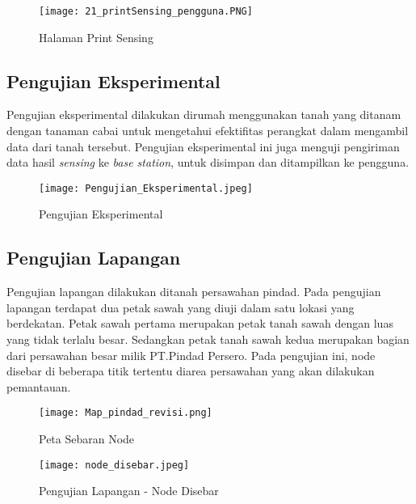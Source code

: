 \begin{itemize}
        \begin{figure}[H]
        	\centering  
        	\texttt{[image: 21\_printSensing\_pengguna.PNG]}  
        	\caption[Halaman Print Sensing]{Halaman Print Sensing} 
        	\label{fig:Halaman Print Sensing} 
        \end{figure}
        
    \end{itemize}
   
   \subsection{Pengujian Eksperimental}
   Pengujian eksperimental dilakukan dirumah menggunakan tanah yang ditanam dengan tanaman cabai untuk mengetahui efektifitas perangkat dalam mengambil data dari tanah tersebut. Pengujian eksperimental ini juga menguji pengiriman data hasil \textit{sensing} ke \textit{base station}, untuk disimpan dan ditampilkan ke pengguna. 
   
        \begin{figure}[H]
        	\centering  
        	\texttt{[image: Pengujian\_Eksperimental.jpeg]}  
        	\caption[Pengujian Eksperimental]{Pengujian Eksperimental} 
        	\label{fig:Pengujian Eksperimental} 
        \end{figure}
   
   \subsection{Pengujian Lapangan}
   Pengujian lapangan dilakukan ditanah persawahan pindad. Pada pengujian lapangan terdapat dua petak sawah yang diuji dalam satu lokasi yang berdekatan. Petak sawah pertama merupakan petak tanah sawah dengan luas yang tidak terlalu besar. Sedangkan petak tanah sawah kedua merupakan bagian dari persawahan besar milik PT.Pindad Persero. Pada pengujian ini, node disebar di beberapa titik tertentu diarea persawahan yang akan dilakukan pemantauan.
   
     \begin{figure}[H]
        	\centering  
        	\texttt{[image: Map\_pindad\_revisi.png]} 
        	\caption[Peta Sebaran Node]{Peta Sebaran Node} 
        	\label{fig:Peta Sebaran Node} 
        \end{figure}
   
        \begin{figure}[H]
        	\centering  
        	\texttt{[image: node\_disebar.jpeg]} 
        	\caption[Pengujian Lapangan - Node Disebar]{Pengujian Lapangan - Node Disebar} 
        	\label{fig:Pengujian Lapangan - Node Disebar} 
        \end{figure}
        
